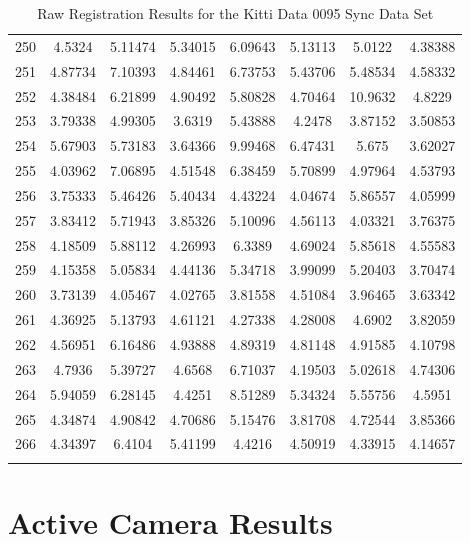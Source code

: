 \begin{center}
\begin{longtable}{cccccccc}
250 & 4.5324 & 5.11474 & 5.34015 & 6.09643 & 5.13113 & 5.0122 & 4.38388\\
251 & 4.87734 & 7.10393 & 4.84461 & 6.73753 & 5.43706 & 5.48534 & 4.58332\\
252 & 4.38484 & 6.21899 & 4.90492 & 5.80828 & 4.70464 & 10.9632 & 4.8229\\
253 & 3.79338 & 4.99305 & 3.6319 & 5.43888 & 4.2478 & 3.87152 & 3.50853\\
254 & 5.67903 & 5.73183 & 3.64366 & 9.99468 & 6.47431 & 5.675 & 3.62027\\
255 & 4.03962 & 7.06895 & 4.51548 & 6.38459 & 5.70899 & 4.97964 & 4.53793\\
256 & 3.75333 & 5.46426 & 5.40434 & 4.43224 & 4.04674 & 5.86557 & 4.05999\\
257 & 3.83412 & 5.71943 & 3.85326 & 5.10096 & 4.56113 & 4.03321 & 3.76375\\
258 & 4.18509 & 5.88112 & 4.26993 & 6.3389 & 4.69024 & 5.85618 & 4.55583\\
259 & 4.15358 & 5.05834 & 4.44136 & 5.34718 & 3.99099 & 5.20403 & 3.70474\\
260 & 3.73139 & 4.05467 & 4.02765 & 3.81558 & 4.51084 & 3.96465 & 3.63342\\
261 & 4.36925 & 5.13793 & 4.61121 & 4.27338 & 4.28008 & 4.6902 & 3.82059\\
262 & 4.56951 & 6.16486 & 4.93888 & 4.89319 & 4.81148 & 4.91585 & 4.10798\\
263 & 4.7936 & 5.39727 & 4.6568 & 6.71037 & 4.19503 & 5.02618 & 4.74306\\
264 & 5.94059 & 6.28145 & 4.4251 & 8.51289 & 5.34324 & 5.55756 & 4.5951\\
265 & 4.34874 & 4.90842 & 4.70686 & 5.15476 & 3.81708 & 4.72544 & 3.85366\\
266 & 4.34397 & 6.4104 & 5.41199 & 4.4216 & 4.50919 & 4.33915 & 4.14657\\
\caption{Raw Registration Results for the Kitti Data 0095 Sync Data Set}
\label{tab:kittidata0095syncFULL}
\end{longtable}
\end{center} 

\section{Active Camera Results}
\label{ActiveResultsRaw}

